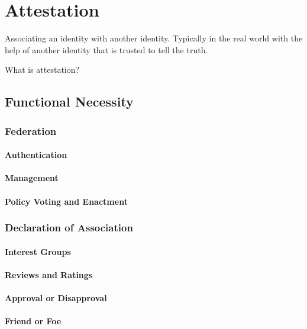 \chapter{Attestation}

Associating an identity with another identity. Typically in the real world
with the help of another identity that is trusted to tell the truth.

What is attestation?

\section{Functional Necessity}

\subsection{Federation}

\subsubsection{Authentication}

\subsubsection{Management}

\subsubsection{Policy Voting and Enactment}

\subsection{Declaration of Association}

\subsubsection{Interest Groups}

\subsubsection{Reviews and Ratings}

\subsubsection{Approval or Disapproval}

\subsubsection{Friend or Foe}

